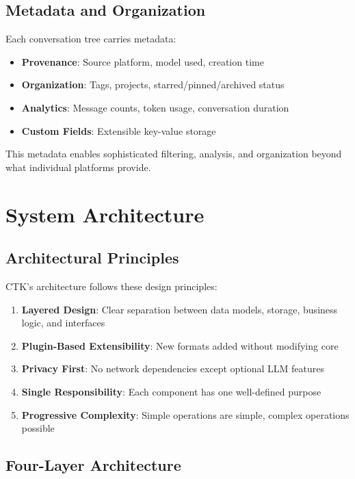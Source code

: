 \documentclass[11pt,letterpaper]{article}
\begin{document}
\subsection{Metadata and Organization}

Each conversation tree carries metadata:

\begin{itemize}
    \item \textbf{Provenance}: Source platform, model used, creation time
    \item \textbf{Organization}: Tags, projects, starred/pinned/archived status
    \item \textbf{Analytics}: Message counts, token usage, conversation duration
    \item \textbf{Custom Fields}: Extensible key-value storage
\end{itemize}

This metadata enables sophisticated filtering, analysis, and organization beyond what individual platforms provide.

\section{System Architecture}
\label{sec:architecture}

\subsection{Architectural Principles}

CTK's architecture follows these design principles:

\begin{enumerate}
    \item \textbf{Layered Design}: Clear separation between data models, storage, business logic, and interfaces
    \item \textbf{Plugin-Based Extensibility}: New formats added without modifying core
    \item \textbf{Privacy First}: No network dependencies except optional LLM features
    \item \textbf{Single Responsibility}: Each component has one well-defined purpose
    \item \textbf{Progressive Complexity}: Simple operations are simple, complex operations possible
\end{enumerate}

\subsection{Four-Layer Architecture}
\end{document}

